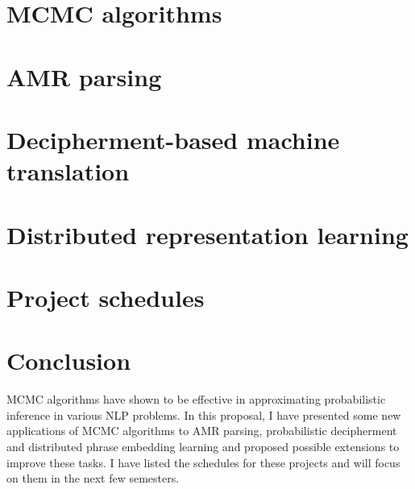\documentclass[12pt,leqno]{report}
\begin{document}
\begin{CJK}{UTF8}{cyberbit}
\chapter{MCMC algorithms}
\label{chap:MCMC}

\break

\chapter{AMR parsing}
\label{chap:amr}

\break

\chapter{Decipherment-based machine translation}
\label{chap:decipher}

\break

\chapter{Distributed representation learning}
\label{chap:embedding}

\break

%
\chapter{Project schedules}
\label{chap:schedule}

\break
\chapter{Conclusion}
\label{chap:conclusion}
MCMC algorithms have shown to be effective in approximating probabilistic inference in various NLP problems.
In this proposal, I have presented some new applications of MCMC algorithms to AMR parsing, probabilistic decipherment and distributed phrase embedding learning and proposed possible extensions to
improve these tasks. I have listed the schedules for these projects and will focus on them in the next few semesters. 
\break



\appendix
\end{CJK}
\end{document}
